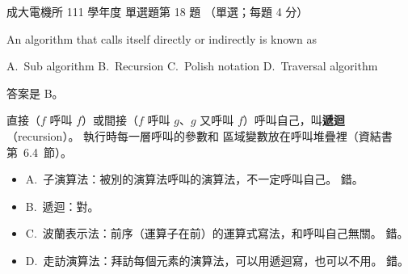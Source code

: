 \begin{pastexam}[label={px:ncku-111-ee-ds-18}]{成大電機所 111 學年度 單選題第 18 題}
（單選；每題 4 分）

An algorithm that calls itself directly or indirectly is known as

A.~Sub algorithm \qquad B.~Recursion \qquad C.~Polish notation \qquad D.~Traversal algorithm
\end{pastexam}

\begin{pastsoln}
答案是 B。

直接（$f$ 呼叫 $f$）或間接（$f$ 呼叫 $g$、$g$ 又呼叫 $f$）呼叫自己，叫\textbf{遞迴}（recursion）。 執行時每一層呼叫的參數和
區域變數放在呼叫堆疊裡（資結書第~6.4~節）。
\begin{itemize}
\item A.~子演算法：被別的演算法呼叫的演算法，不一定呼叫自己。 錯。
\item B.~遞迴：對。
\item C.~波蘭表示法：前序（運算子在前）的運算式寫法，和呼叫自己無關。 錯。
\item D.~走訪演算法：拜訪每個元素的演算法，可以用遞迴寫，也可以不用。 錯。
\end{itemize}
\end{pastsoln}
